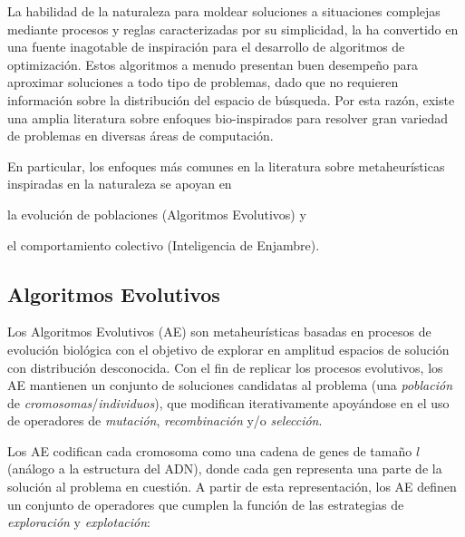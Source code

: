La habilidad de la naturaleza para moldear soluciones a situaciones complejas mediante procesos y reglas caracterizadas por su simplicidad, la ha convertido en una fuente inagotable de inspiración para el desarrollo de algoritmos de optimización. Estos algoritmos a menudo presentan buen desempeño para aproximar soluciones a todo tipo de problemas, dado que no requieren información sobre la distribución del espacio de búsqueda. Por esta razón, existe una amplia literatura sobre enfoques bio-inspirados \cite{binitha2012survey} para resolver gran variedad de problemas en diversas áreas de computación.

En particular, los enfoques más comunes en la literatura \cite{yang2013swarm} sobre metaheurísticas inspiradas en la naturaleza se apoyan en
\begin{inparaenum}
\item la evolución de poblaciones (Algoritmos Evolutivos) y
\item el comportamiento colectivo (Inteligencia de Enjambre).
\end{inparaenum}

\subsection{Algoritmos Evolutivos}

Los Algoritmos Evolutivos (AE) son metaheurísticas basadas en procesos de evolución biológica con el objetivo de explorar en amplitud espacios de solución con distribución desconocida. Con el fin de replicar los procesos evolutivos, los AE mantienen un conjunto de soluciones candidatas al problema (una \emph{población} de \emph{cromosomas}/\emph{individuos}), que modifican iterativamente apoyándose en el uso de operadores de \emph{mutación}, \emph{recombinación} y/o \emph{selección}.

Los AE codifican cada cromosoma como una cadena de genes de tamaño $l$ (análogo a la estructura del ADN), donde cada gen representa una parte de la solución al problema en cuestión. A partir de esta representación, los AE definen un conjunto de operadores que cumplen la función de las estrategias de \emph{exploración} y \emph{explotación}:

